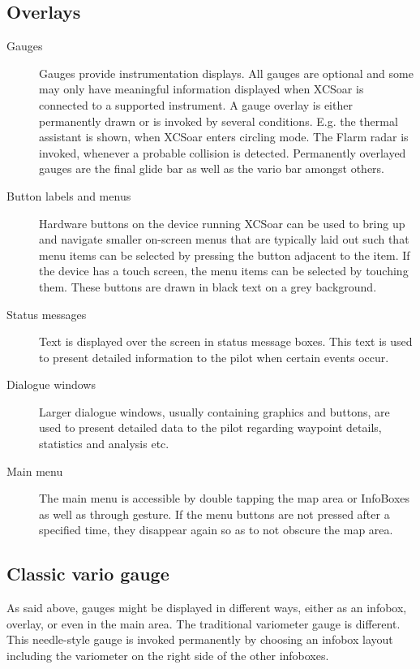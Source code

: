 \subsection*{Overlays}
\begin{description}
\item[Gauges]  Gauges provide instrumentation displays. All gauges are optional
and some may only have meaningful information displayed when XCSoar is
connected to a supported instrument.
A gauge overlay is either permanently drawn or is invoked by several
conditions.  E.g. the thermal assistant is shown, when XCSoar enters circling
mode. The Flarm radar is invoked, whenever a probable collision is detected.
Permanently overlayed gauges are the final glide bar as well as the vario bar
amongst others.
\item[Button labels and menus] Hardware buttons on the device running XCSoar
can be used to bring up and navigate smaller on-screen menus that are
typically laid out such that menu items can be selected by pressing the
button adjacent to the item.  If the device has a touch screen, the menu
items can be selected by touching them.  These buttons are drawn in black
text on a grey background.
\item[Status messages] Text is displayed over the screen in status message
boxes.  This text is used to present detailed information to the pilot when
certain events occur.
\item[Dialogue windows] Larger dialogue windows, usually containing graphics and
buttons, are used to present detailed data to the pilot regarding waypoint
details, statistics and analysis etc.
\item[Main menu] The main menu is accessible by double tapping the map area or
InfoBoxes as well as through gesture. If the menu buttons are not pressed after
 a specified time, they disappear again so as to not obscure
the map area.
\end{description}

\subsection*{Classic vario gauge}
As said above, gauges might be displayed in different ways, either as an
infobox, overlay, or even in the main area. The traditional variometer gauge is
different. This needle-style gauge is invoked permanently by choosing an infobox
layout including the variometer on the right side of the other infoboxes.

